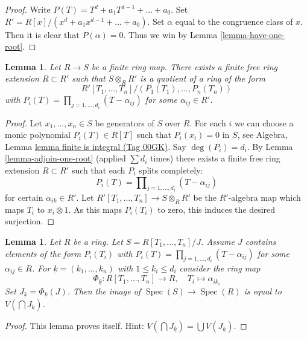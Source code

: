 \documentclass{amsart}
\theoremstyle{plain}
\newtheorem{lemma}[subsection]{Lemma}
\theoremstyle{definition}
\theoremstyle{remark}
\numberwithin{equation}{subsection}
\def\Spec{\mathop{\mathrm{Spec}}}
\begin{document}
\begin{proof}
Write $P(T) = T^d + a_1T^{d - 1} + \ldots + a_0$.
Set $R' = R[x]/(x^d + a_1x^{d - 1} + \ldots + a_0)$.
Set $\alpha$ equal to the congruence class of $x$.
Then it is clear that $P(\alpha) = 0$. Thus we win by
Lemma \ref{lemma-have-one-root}.
\end{proof}


\begin{lemma}
\label{lemma-finite-split}
Let $R \to S$ be a finite ring map.
There exists a finite free ring extension $R \subset R'$ such
that $S \otimes_R R'$ is a quotient of a ring of the form
$$
R'[T_1, \ldots, T_n]/(P_1(T_1), \ldots, P_n(T_n))
$$
with $P_i(T) = \prod_{j = 1, \ldots, d_i} (T - \alpha_{ij})$ for some
$\alpha_{ij} \in R'$.
\end{lemma}

\begin{proof}
Let $x_1, \ldots, x_n \in S$ be generators of $S$ over $R$.
For each $i$ we can choose a monic polynomial $P_i(T) \in R[T]$
such that $P_i(x_i) = 0$ in $S$, see
Algebra, Lemma \href{https://stacks.math.columbia.edu/tag/00GK}{lemma finite is integral (Tag 00GK)}.
Say $\deg(P_i) = d_i$. By
Lemma \ref{lemma-adjoin-one-root}
(applied $\sum d_i$ times) there exists a finite free ring
extension $R \subset R'$ such that each $P_i$ splits completely:
$$
P_i(T) = \prod\nolimits_{j = 1, \ldots, d_i} (T - \alpha_{ij})
$$
for certain $\alpha_{ik} \in R'$. Let
$R'[T_1, \ldots, T_n] \to S \otimes_R R'$ be the $R'$-algebra map
which maps $T_i$ to $x_i \otimes 1$. As this maps $P_i(T_i)$ to zero,
this induces the desired surjection.
\end{proof}


\begin{lemma}
\label{lemma-split-image}
Let $R$ be a ring.
Let $S = R[T_1, \ldots, T_n]/J$.
Assume $J$ contains elements of the form $P_i(T_i)$
with $P_i(T) = \prod_{j = 1, \ldots, d_i} (T - \alpha_{ij})$ for some
$\alpha_{ij} \in R$. For $\underline{k} = (k_1, \ldots, k_n)$
with $1 \leq k_i \leq d_i$ consider the ring map
$$
\Phi_{\underline{k}} : R[T_1, \ldots, T_n] \to R,
\quad
T_i \longmapsto \alpha_{ik_i}
$$
Set $J_{\underline{k}} = \Phi_{\underline{k}}(J)$.
Then the image of $\Spec(S) \to \Spec(R)$ is equal to
$V(\bigcap J_{\underline{k}})$.
\end{lemma}

\begin{proof}
This lemma proves itself. Hint:
$V(\bigcap J_{\underline{k}}) = \bigcup V(J_{\underline{k}})$.
\end{proof}
\end{document}
